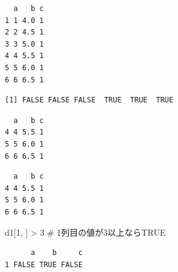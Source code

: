 \documentclass[
  letterpaper,
  DIV=11,
  numbers=noendperiod]{scrreprt}
\newenvironment{Shaded}{\begin{snugshade}}{\end{snugshade}}
\newcommand{\CommentTok}[1]{\textcolor[rgb]{0.37,0.37,0.37}{#1}}
\newcommand{\DecValTok}[1]{\textcolor[rgb]{0.68,0.00,0.00}{#1}}
\newcommand{\FunctionTok}[1]{\textcolor[rgb]{0.28,0.35,0.67}{#1}}
\newcommand{\NormalTok}[1]{\textcolor[rgb]{0.00,0.23,0.31}{#1}}
\newcommand{\SpecialCharTok}[1]{\textcolor[rgb]{0.37,0.37,0.37}{#1}}
\begin{document}
\begin{verbatim}
  a   b c
1 1 4.0 1
2 2 4.5 1
3 3 5.0 1
4 4 5.5 1
5 5 6.0 1
6 6 6.5 1
\end{verbatim}

\begin{Shaded}
\end{Shaded}

\begin{verbatim}
[1] FALSE FALSE FALSE  TRUE  TRUE  TRUE
\end{verbatim}

\begin{Shaded}
\end{Shaded}

\begin{verbatim}
  a   b c
4 4 5.5 1
5 5 6.0 1
6 6 6.5 1
\end{verbatim}

\begin{Shaded}
\end{Shaded}

\begin{verbatim}
  a   b c
4 4 5.5 1
5 5 6.0 1
6 6 6.5 1
\end{verbatim}

\begin{Shaded}
\begin{Highlighting}[]
\NormalTok{d1[}\DecValTok{1}\NormalTok{, ] }\SpecialCharTok{\textgreater{}} \DecValTok{3} \CommentTok{\# 1列目の値が3以上ならTRUE}
\end{Highlighting}
\end{Shaded}

\begin{verbatim}
      a    b     c
1 FALSE TRUE FALSE
\end{verbatim}
\end{document}
